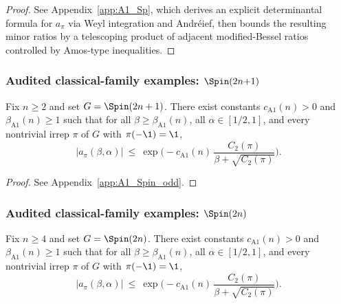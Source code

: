 \begin{proof}
See Appendix~\ref{app:A1_Sp}, which derives an explicit determinantal formula for $a_{\pi}$ via Weyl integration and Andr\'eief,
then bounds the resulting minor ratios by a telescoping product of adjacent modified-Bessel ratios controlled by Amos-type inequalities.
\end{proof}

\subsubsection{Audited classical-family examples: \texorpdfstring{$\Spin(2n{+}1)$}{Spin(2n+1)}}
\label{subsec:Spin_2n1_one_plaq}

\begin{proposition}
\label{prop:A1_Spin_odd}
Fix $n\ge 2$ and set $G=\Spin(2n+1)$.
There exist constants $c_{\mathrm{A1}}(n)>0$ and $\beta_{\mathrm{A1}}(n)\ge 1$ such that for all $\beta\ge\beta_{\mathrm{A1}}(n)$,
all $\alpha\in[1/2,1]$, and every nontrivial irrep $\pi$ of $G$ with $\pi(-\1)=\1$,
\begin{equation}
\label{eq:A1_Spin_odd_bound}
\big|a_{\pi}(\beta,\alpha)\big|
\ \le\ 
\exp\!\Big(-c_{\mathrm{A1}}(n)\,\frac{C_2(\pi)}{\beta+\sqrt{C_2(\pi)}}\Big).
\end{equation}
\end{proposition}

\begin{proof}
See Appendix~\ref{app:A1_Spin_odd}.
\end{proof}

\subsubsection{Audited classical-family examples: \texorpdfstring{$\Spin(2n)$}{Spin(2n)}}
\label{subsec:Spin_2n_one_plaq}

\begin{proposition}
\label{prop:A1_Spin_even}
Fix $n\ge 4$ and set $G=\Spin(2n)$.
There exist constants $c_{\mathrm{A1}}(n)>0$ and $\beta_{\mathrm{A1}}(n)\ge 1$ such that for all $\beta\ge\beta_{\mathrm{A1}}(n)$,
all $\alpha\in[1/2,1]$, and every nontrivial irrep $\pi$ of $G$ with $\pi(-\1)=\1$,
\begin{equation}
\label{eq:A1_Spin_even_bound}
\big|a_{\pi}(\beta,\alpha)\big|
\ \le\ 
\exp\!\Big(-c_{\mathrm{A1}}(n)\,\frac{C_2(\pi)}{\beta+\sqrt{C_2(\pi)}}\Big).
\end{equation}
\end{proposition}

